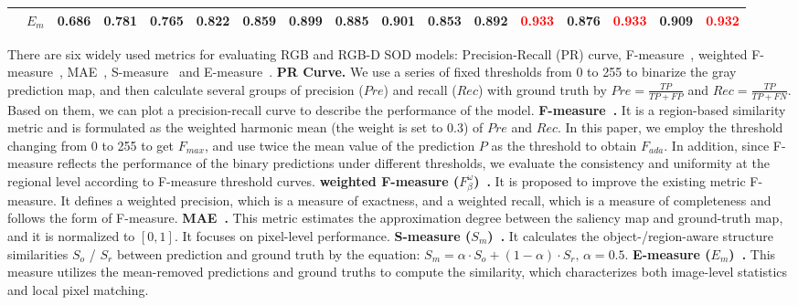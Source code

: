 \documentclass[runningheads]{llncs}
\begin{document}
\begin{table}[t]
{\begin{tabular}{@{}rl|ccccccccccc|cc|cc@{}}
    & $E_{m}$              & 0.686                                     & 0.781                                       & 0.765                                       & 0.822                                  & 0.859                                      & 0.899                                          & 0.885                                      & 0.901                                        & 0.853                                            & 0.892                                      & \textcolor{red}{\textbf{0.933}} & 0.876                                          & \textcolor{red}{\textbf{0.933}} & 0.909                                     & \textcolor{red}{\textbf{0.932}} \\
   \bottomrule
  \end{tabular}}
\end{table}

There are six widely used metrics for evaluating RGB and RGB-D SOD models: Precision-Recall (PR) curve, F-measure~\cite{Fmeasure}, weighted F-measure~\cite{wFmeasure}, MAE~\cite{MAE}, S-measure~\cite{Smeasure} and E-measure~\cite{Emeasure}.
\noindent\textbf{PR Curve.} We use a series of fixed thresholds from 0 to 255 to binarize the gray prediction map, and then calculate several groups of precision ($Pre$) and recall ($Rec$) with ground truth by $Pre = \frac{TP}{TP+FP}$ and $Rec = \frac{TP}{TP+FN}$. Based on them, we can plot a precision-recall curve to describe the performance of the model.
\noindent\textbf{F-measure~\cite{Fmeasure}.} It is a region-based similarity metric and is formulated as the weighted harmonic mean (the weight is set to 0.3) of $Pre$ and $Rec$. In this paper, we employ the threshold changing from 0 to 255 to get $F_{max}$, and use twice the mean value of the prediction $P$ as the threshold to obtain $F_{ada}$. In addition, since F-measure reflects the performance of the binary predictions under different thresholds, we evaluate the consistency and uniformity at the regional level according to F-measure threshold curves.
\noindent\textbf{weighted F-measure ($F^{\omega}_{\beta}$)~\cite{wFmeasure}.} It is proposed to improve the existing metric F-measure. It defines a weighted precision, which is a measure of exactness, and a weighted recall, which is a measure of completeness and follows the form of F-measure.
\noindent\textbf{MAE~\cite{MAE}.} This metric estimates the approximation degree between the saliency map and ground-truth map, and it is normalized to $[0, 1]$. It focuses on pixel-level performance.
\noindent\textbf{S-measure ($S_{m}$)~\cite{Smeasure}.} It calculates the object-/region-aware structure similarities $S_{o}$ / $S_{r}$ between prediction and ground truth by the equation:
$S_{m} = \alpha \cdot S_{o} + (1 - \alpha) \cdot S_{r}, \, \alpha = 0.5$.
\noindent\textbf{E-measure ($E_{m}$)~\cite{Emeasure}.} This measure utilizes the mean-removed predictions and ground truths to compute the similarity, which characterizes both image-level statistics and local pixel matching.
\end{document}
